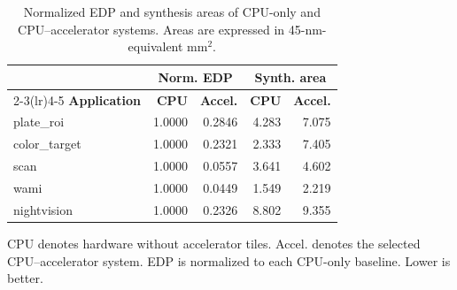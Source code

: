 \begin{table}[t]
\centering
\caption{Normalized EDP and synthesis areas of CPU-only and CPU--accelerator systems. Areas are expressed in 45-nm-equivalent mm$^2$.}
\label{tab:chip_area_energy}
\footnotesize
\renewcommand{\arraystretch}{1.15}
\setlength{\tabcolsep}{3pt}
\begin{tabular*}{\columnwidth}{@{\extracolsep{\fill}}lrrrr@{}}
\toprule
 & \multicolumn{2}{c}{\textbf{Norm. EDP}} & \multicolumn{2}{c}{\textbf{Synth. area}} \\
\cmidrule(lr){2-3}\cmidrule(lr){4-5}
\textbf{Application} & \textbf{CPU} & \textbf{Accel.} & \textbf{CPU} & \textbf{Accel.} \\
\midrule
plate\_roi & 1.0000 & 0.2846 & 4.283 & 7.075 \\
color\_target & 1.0000 & 0.2321 & 2.333 & 7.405 \\
scan & 1.0000 & 0.0557 & 3.641 & 4.602 \\
wami & 1.0000 & 0.0449 & 1.549 & 2.219 \\
nightvision & 1.0000 & 0.2326 & 8.802 & 9.355 \\
\bottomrule
\end{tabular*}
\par\vspace{4pt}
\parbox{\columnwidth}{\scriptsize CPU denotes hardware without accelerator tiles. Accel. denotes the selected CPU--accelerator system. EDP is normalized to each CPU-only baseline. Lower is better.}
\end{table}
